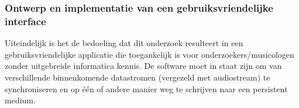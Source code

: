 \subsubsection{Ontwerp en implementatie van een gebruiksvriendelijke interface}

Uiteindelijk is het de bedoeling dat dit onderzoek resulteert in een gebruiksvriendelijke applicatie die toegankelijk is voor onderzoekers/musicologen zonder uitgebreide informatica kennis. De software moet in staat zijn om van verschillende binnenkomende datastromen (vergezeld met audiostream) te synchroniseren en op één of andere manier weg te schrijven naar een persistent medium.

